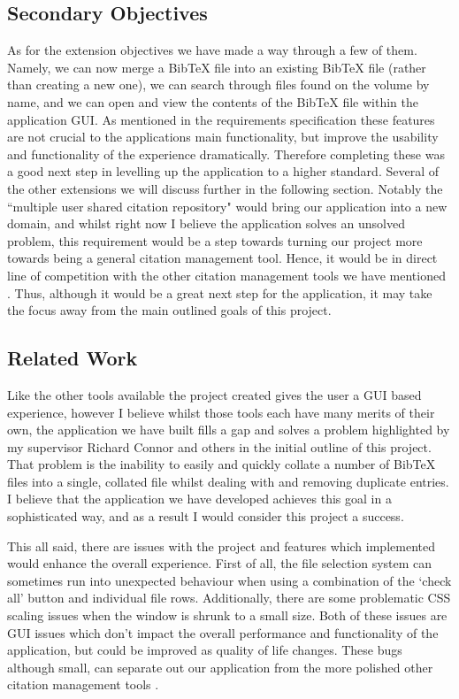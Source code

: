 \documentclass[a4paper,11pt]{article}
\begin{document}
\subsection{Secondary Objectives}

As for the extension objectives we have made a way through a few of them. Namely, we can now merge a BibTeX file into an existing BibTeX file (rather than creating a new one), we can search through files found on the volume by name, and we can open and view the contents of the BibTeX file within the application GUI. As mentioned in the requirements specification these features are not crucial to the applications main functionality, but improve the usability and functionality of the experience dramatically. Therefore completing these was a good next step in levelling up the application to a higher standard. Several of the other extensions we will discuss further in the following section. Notably the ``multiple user shared citation repository" would bring our application into a new domain, and whilst right now I believe the application solves an unsolved problem, this requirement would be a step towards turning our project more towards being a general citation management tool. Hence, it would be in direct line of competition with the other citation management tools we have mentioned \citep{mendeley, zotero, papersapp}. Thus, although it would be a great next step for the application, it may take the focus away from the main outlined goals of this project.

\subsection{Related Work}

Like the other tools available \citep{mendeley, zotero, papersapp} the project created gives the user a GUI based experience, however I believe whilst those tools each have many merits of their own, the application we have built fills a gap and solves a problem highlighted by my supervisor Richard Connor and others in the initial outline of this project. That problem is the inability to easily and quickly collate a number of BibTeX files into a single, collated file whilst dealing with and removing duplicate entries. I believe that the application we have developed achieves this goal in a sophisticated way, and as a result I would consider this project a success.

This all said, there are issues with the project and features which implemented would enhance the overall experience. First of all, the file selection system can sometimes run into unexpected behaviour when using a combination of the `check all' button and individual file rows. Additionally, there are some problematic CSS scaling issues when the window is shrunk to a small size. Both of these issues are GUI issues which don't impact the overall performance and functionality of the application, but could be improved as quality of life changes. These bugs although small, can separate out our application from the more polished other citation management tools \citep{mendeley, zotero, papersapp}.
\end{document}

